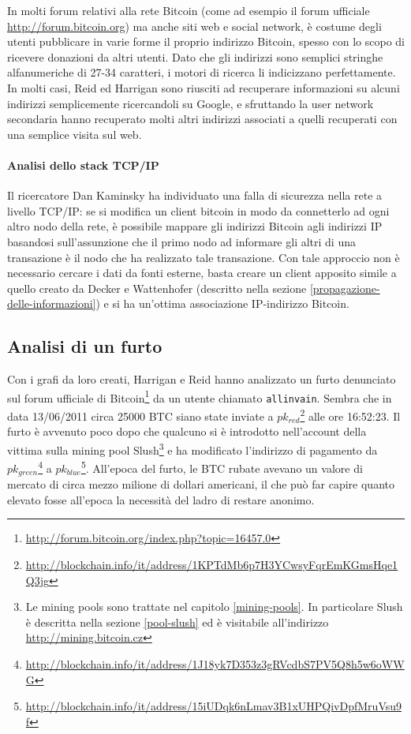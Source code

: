 In molti forum relativi alla rete Bitcoin (come ad esempio il forum ufficiale \url{http://forum.bitcoin.org}) ma anche siti web e social network, è costume degli utenti pubblicare in varie forme il proprio indirizzo Bitcoin, spesso con lo scopo di ricevere donazioni da altri utenti. Dato che gli indirizzi sono semplici stringhe alfanumeriche di 27-34 caratteri, i motori di ricerca li indicizzano perfettamente.
In molti casi, Reid ed Harrigan sono riusciti ad recuperare informazioni su alcuni indirizzi semplicemente ricercandoli su Google, e sfruttando la user network secondaria hanno recuperato molti altri indirizzi associati a quelli recuperati con una semplice visita sul web.

\paragraph{Analisi dello stack TCP/IP}

Il ricercatore Dan Kaminsky ha individuato una falla di sicurezza nella rete a livello TCP/IP: se si modifica un client bitcoin in modo da connetterlo ad ogni altro nodo della rete, è possibile mappare gli indirizzi Bitcoin agli indirizzi IP basandosi sull'assunzione che il primo nodo ad informare gli altri di una transazione è il nodo che ha realizzato tale transazione. Con tale approccio non è necessario cercare i dati da fonti esterne, basta creare un client apposito simile a quello creato da Decker e Wattenhofer (descritto nella sezione \ref{propagazione-delle-informazioni}) e si ha un'ottima associazione IP-indirizzo Bitcoin.

\subsection{Analisi di un furto}


Con i grafi da loro creati, Harrigan e Reid hanno analizzato un furto denunciato sul forum ufficiale di Bitcoin\footnote{\url{http://forum.bitcoin.org/index.php?topic=16457.0}} da un utente chiamato \verb|allinvain|. Sembra che in data 13/06/2011 circa 25000 BTC siano state inviate a $pk_{red}$\footnote{\url{http://blockchain.info/it/address/1KPTdMb6p7H3YCwsyFqrEmKGmsHqe1Q3jg}} alle ore 16:52:23. Il furto è avvenuto poco dopo che qualcuno si è introdotto nell'account della vittima sulla mining pool Slush\footnote{Le mining pools sono trattate nel capitolo \ref{mining-pools}. In particolare Slush è descritta nella sezione \ref{pool-slush} ed è visitabile all'indirizzo \url{http://mining.bitcoin.cz}} e ha modificato l'indirizzo di pagamento da $pk_{green}$\footnote{\url{http://blockchain.info/it/address/1J18yk7D353z3gRVcdbS7PV5Q8h5w6oWWG}} a $pk_{blue}$\footnote{\url{http://blockchain.info/it/address/15iUDqk6nLmav3B1xUHPQivDpfMruVsu9f}}. All'epoca del furto, le BTC rubate avevano un valore di mercato di circa mezzo milione di dollari americani, il che può far capire quanto elevato fosse all'epoca la necessità del ladro di restare anonimo.

